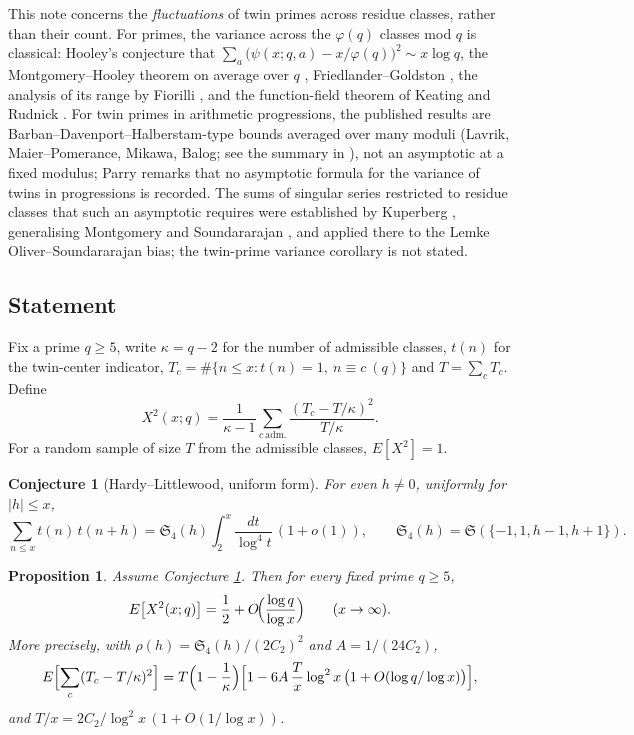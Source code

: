 \documentclass[11pt]{article}
\newtheorem{proposition}[theorem]{Proposition}
\newtheorem{conjecture}[theorem]{Conjecture}
\newcommand{\sing}{\mathfrak{S}}
\begin{document}
This note concerns the \emph{fluctuations} of twin primes across residue classes, rather than their count. For primes, the variance across the $\varphi(q)$ classes mod $q$ is classical: Hooley's conjecture \cite{Hooley} that $\sum_a\bigl(\psi(x;q,a)-x/\varphi(q)\bigr)^2\sim x\log q$, the Montgomery--Hooley theorem on average over $q$ \cite{Montgomery,Hooley}, Friedlander--Goldston \cite{FG}, the analysis of its range by Fiorilli \cite{Fiorilli}, and the function-field theorem of Keating and Rudnick \cite{KR}. For twin primes in arithmetic progressions, the published results are Barban--Davenport--Halberstam-type bounds averaged over many moduli (Lavrik, Maier--Pomerance, Mikawa, Balog; see the summary in \cite{Palimar}), not an asymptotic at a fixed modulus; Parry \cite{Parry} remarks that no asymptotic formula for the variance of twins in progressions is recorded. The sums of singular series restricted to residue classes that such an asymptotic requires were established by Kuperberg \cite{Kuperberg}, generalising Montgomery and Soundararajan \cite{MS}, and applied there to the Lemke Oliver--Soundararajan bias; the twin-prime variance corollary is not stated.

\subsection*{Statement}
Fix a prime $q\ge5$, write $\kappa=q-2$ for the number of admissible classes, $t(n)$ for the twin-center indicator, $T_c=\#\{n\le x: t(n)=1,\ n\equiv c\ (q)\}$ and $T=\sum_c T_c$. Define
\[
X^2(x;q)=\frac{1}{\kappa-1}\sum_{c\ \mathrm{adm.}}\frac{(T_c-T/\kappa)^2}{T/\kappa}.
\]
For a random sample of size $T$ from the admissible classes, $E[X^2]=1$.

\begin{conjecture}[Hardy--Littlewood, uniform form]\label{HL}
For even $h\ne0$, uniformly for $|h|\le x$,
\[
\sum_{n\le x} t(n)\,t(n+h) = \sing_4(h)\int_2^x\frac{dt}{\log^4 t}\,(1+o(1)),\qquad \sing_4(h)=\sing(\{-1,1,h-1,h+1\}).
\]
\end{conjecture}

\begin{proposition}\label{main}
Assume Conjecture \ref{HL}. Then for every fixed prime $q\ge5$,
\[
E\bigl[X^2(x;q)\bigr] = \frac12 + O\!\Bigl(\frac{\log q}{\log x}\Bigr)\qquad (x\to\infty).
\]
More precisely, with $\rho(h)=\sing_4(h)/(2C_2)^2$ and $A=1/(24C_2)$,
\[
E\Bigl[\sum_c (T_c-T/\kappa)^2\Bigr]=T\Bigl(1-\frac1\kappa\Bigr)\Bigl[1-6A\,\frac{T}{x}\log^2 x\,\bigl(1+O(\log q/\log x)\bigr)\Bigr],
\]
and $T/x=2C_2/\log^2x\,(1+O(1/\log x))$.
\end{proposition}
\end{document}
